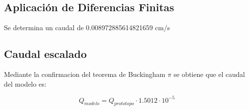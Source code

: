\subsection{Aplicación de Diferencias Finitas}

Se determina un caudal de 0.008972885614821659 cm/s

\subsection{Caudal escalado}

Mediante la confirmacion del teorema de Buckingham $\pi$ se obtiene que el caudal del modelo es:

\begin{equation}
    Q_{modelo} = Q_{prototopo} \cdot 1.5012 \cdot 10^{-5}
\end{equation}

